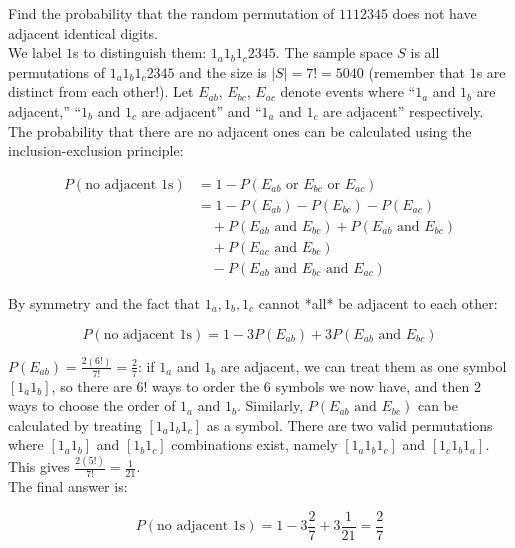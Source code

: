 \begin{texample}
	Find the probability that the random permutation of $1112345$ does not have adjacent identical digits. \\
	
	We label $1$s to distinguish them: $1_a 1_b 1_c 2345$. The sample space $S$ is all permutations of $1_a 1_b 1_c 2345$ and the size is $|S|=7!=5040$ (remember that $1$s are distinct from each other!). Let $E_{ab}$, $E_{bc}$, $E_{ac}$ denote events where ``$1_a$ and $1_b$ are adjacent,'' ``$1_b$ and $1_c$ are adjacent'' and ``$1_a$ and $1_c$ are adjacent'' respectively. The probability that there are no adjacent ones can be calculated using the inclusion-exclusion principle:
	
	\begin{align*}
		P(\text{no adjacent 1s}) &= 1 - P(E_{ab} \text{ or } E_{bc} \text{ or } E_{ac}) \\
		&= 1 - P(E_{ab}) - P(E_{bc}) - P(E_{ac}) \\
		& \quad + P(E_{ab} \text{ and } E_{bc}) + P(E_{ab} \text{ and } E_{bc})  \\
		& \quad + P(E_{ac} \text{ and } E_{bc}) \\
		& \quad - P(E_{ab} \text{ and } E_{bc} \text{ and } E_{ac})
	\end{align*}
	
	By symmetry and the fact that $1_a, 1_b, 1_c$ cannot *all* be adjacent to each other:
	
	$$P(\text{no adjacent 1s}) = 1 - 3 P(E_{ab}) + 3 P(E_{ab} \text{ and } E_{bc})$$
	
	$P(E_{ab}) = \frac{2 (6!)}{7!} = \frac27$: if $1_a$ and $1_b$ are adjacent, we can treat them as one symbol $[1_a 1_b]$, so there are $6!$ ways to order the $6$ symbols we now have, and then $2$ ways to choose the order of $1_a$ and $1_b$. Similarly, $P(E_{ab} \text{ and } E_{bc})$ can be calculated by treating $[1_a 1_b 1_c]$ as a symbol. There are two valid permutations where $[1_a 1_b]$ and $[1_b 1_c]$ combinations exist, namely $[1_a 1_b 1_c]$ and $[1_c 1_b 1_a]$. This gives $\frac{2 (5!)}{7!}=\frac{1}{21}$. \\
	
	The final answer is:
	
	$$P(\text{no adjacent 1s}) = 1 - 3 \frac27 + 3 \frac{1}{21} = \frac27$$
\end{texample}

